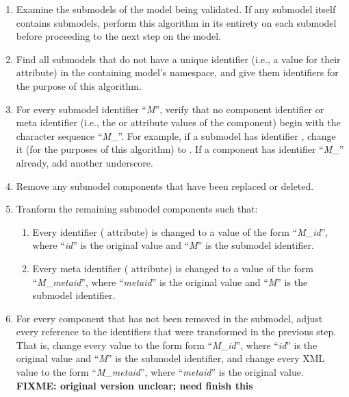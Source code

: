 \begin{enumerate}

\item Examine the submodels of the model being validated.  If any
  submodel itself contains submodels, perform this algorithm in its
  entirety on each submodel before proceeding to the next step on the
  model.

\item Find all submodels that do not have a unique identifier (i.e., a
  value for their  attribute) in the containing model's
  namespace, and give them identifiers for the purpose of this
  algorithm.


\item For every submodel identifier ``\emph{M}'', verify that no component
  identifier or meta identifier (i.e., the  or 
  attribute values of the component) begin with the character sequence
  ``\emph{M\_}''.  For example, if a submodel has identifier
  , change it (for the purposes of this algorithm) to
  .  If a component has identifier ``\emph{M\_}'' already,
  add another underscore.

\item Remove any submodel components that have been replaced or deleted.

\item Tranform the remaining submodel components such that:

  \begin{enumerate}

  \item Every identifier ( attribute) is changed to a value of
    the form ``\emph{M\_id}'', where ``\emph{id}'' is the original
     value and ``\emph{M}'' is the submodel identifier.

  \item Every meta identifier ( attribute) is changed to a
    value of the form ``\emph{M\_metaid}'', where ``\emph{metaid}'' is
    the original  value and ``\emph{M}'' is the submodel
    identifier.

  \end{enumerate}

\item For every component that has not been removed in the submodel,
  adjust every reference to the identifiers that were transformed in the
  previous step.  That is, change every  value to the
  form form ``\emph{M\_id}'', where ``\emph{id}'' is the original
   value and ``\emph{M}'' is the submodel identifier,
  and change every XML  value to the form
  ``\emph{M\_metaid}'', where ``\emph{metaid}'' is the original
   value.  \textbf{FIXME: original version unclear; need
    finish this}


\end{enumerate}
